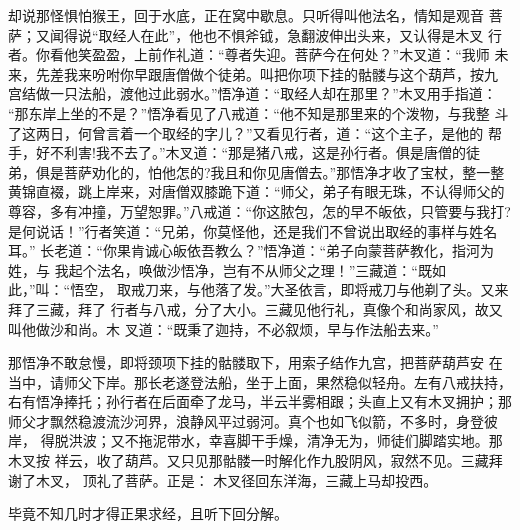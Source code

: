 却说那怪惧怕猴王，回于水底，正在窝中歇息。只听得叫他法名，情知是观音
菩萨；又闻得说“取经人在此”，他也不惧斧钺，急翻波伸出头来，又认得是木叉
行者。你看他笑盈盈，上前作礼道：“尊者失迎。菩萨今在何处？”木叉道：“我师
未来，先差我来吩咐你早跟唐僧做个徒弟。叫把你项下挂的骷髅与这个葫芦，按九
宫结做一只法船，渡他过此弱水。”悟净道：“取经人却在那里？”木叉用手指道：
“那东岸上坐的不是？”悟净看见了八戒道：“他不知是那里来的个泼物，与我整
斗了这两日，何曾言着一个取经的字儿？”又看见行者，道：“这个主子，是他的
帮手，好不利害!我不去了。”木叉道：“那是猪八戒，这是孙行者。俱是唐僧的徒
弟，俱是菩萨劝化的，怕他怎的?我且和你见唐僧去。”那悟净才收了宝杖，整一整
黄锦直裰，跳上岸来，对唐僧双膝跪下道：“师父，弟子有眼无珠，不认得师父的
尊容，多有冲撞，万望恕罪。”八戒道：“你这脓包，怎的早不皈依，只管要与我打?
是何说话！”行者笑道：“兄弟，你莫怪他，还是我们不曾说出取经的事样与姓名耳。”
长老道：“你果肯诚心皈依吾教么？”悟净道：“弟子向蒙菩萨教化，指河为姓，与
我起个法名，唤做沙悟净，岂有不从师父之理！”三藏道：“既如此，”叫：“悟空，
取戒刀来，与他落了发。”大圣依言，即将戒刀与他剃了头。又来拜了三藏，拜了
行者与八戒，分了大小。三藏见他行礼，真像个和尚家风，故又叫他做沙和尚。木
叉道：“既秉了迦持，不必叙烦，早与作法船去来。”

那悟净不敢怠慢，即将颈项下挂的骷髅取下，用索子结作九宫，把菩萨葫芦安
在当中，请师父下岸。那长老遂登法船，坐于上面，果然稳似轻舟。左有八戒扶持，
右有悟净捧托；孙行者在后面牵了龙马，半云半雾相跟；头直上又有木叉拥护；那
师父才飘然稳渡流沙河界，浪静风平过弱河。真个也如飞似箭，不多时，身登彼岸，
得脱洪波；又不拖泥带水，幸喜脚干手燥，清净无为，师徒们脚踏实地。那木叉按
祥云，收了葫芦。又只见那骷髅一时解化作九股阴风，寂然不见。三藏拜谢了木叉，
顶礼了菩萨。正是：
木叉径回东洋海，三藏上马却投西。

毕竟不知几时才得正果求经，且听下回分解。
